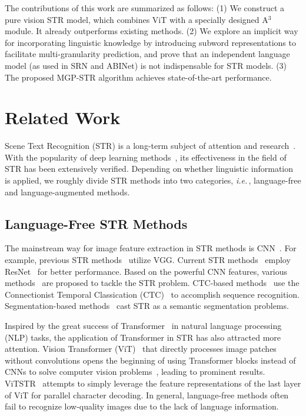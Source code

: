 \documentclass[runningheads]{llncs}
\def\ie{\emph{i.e.}\,}
\begin{document}
The contributions of this work are summarized as follows: (1) We construct a pure vision STR model, which combines ViT with a specially designed A$^3 $ module. It already outperforms existing methods. (2) We explore an implicit way for incorporating linguistic knowledge by introducing subword representations to facilitate multi-granularity prediction, and prove that an independent language model (as used in SRN and ABINet) is not indispensable for STR models. (3) The proposed MGP-STR algorithm achieves state-of-the-art performance.













\section{Related Work}
Scene Text Recognition (STR) is a long-term subject of attention and research~\cite{zhu2016scene,long2021scene,chen2021text}. With the popularity of deep learning methods~\cite{vgg,resnet,rnn1}, its effectiveness in the field of STR has been extensively verified. Depending on whether linguistic information is applied, we roughly divide STR methods into two categories, \ie, language-free and language-augmented methods.

\subsection{Language-Free STR Methods}

The mainstream way for image feature extraction in STR methods is CNN~\cite{vgg,resnet}.
For example, previous STR methods~\cite{CRNN,rare,rnn1} utilize VGG.
Current STR methods~\cite{Rosetta,STAR-Net,deep,GCRNN} employ ResNet~\cite{resnet} for better performance.
Based on the powerful CNN features, various methods~\cite{zhang2022context,PIMNet,liu2022perceiving} are proposed to tackle the STR problem.
CTC-based methods~\cite{CRNN,wan20192d,STAR-Net,gtc,ctc2} use the Connectionist Temporal Classication (CTC)~\cite{ctc} to accomplish sequence recognition.
Segmentation-based methods~\cite{seg,Vocabulary,TextSpotter,TextScanner} cast STR as a semantic segmentation problems. 

Inspired by the great success of Transformer~\cite{trans} in natural language processing (NLP) tasks, the application of Transformer in STR has also attracted more attention. Vision Transformer (ViT)~\cite{dosovitskiy2020image} that directly processes image patches without convolutions opens the beginning of using Transformer blocks instead of CNNs to solve computer vision problems~\cite{liu2021swin,SegFormer}, leading to prominent results. ViTSTR~\cite{ViTSTR} attempts to simply leverage the feature representations of the last layer of  ViT for parallel character decoding. In general, language-free methods often fail to recognize low-quality images due to the lack of language information.
\end{document}
